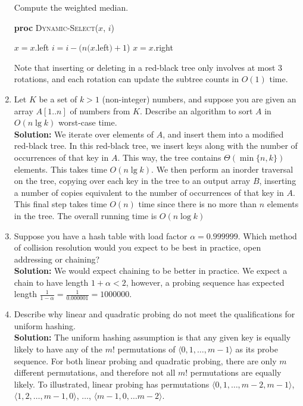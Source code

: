 \documentclass[letterpaper,11pt]{article}
\begin{document}
\begin{enumerate}
\begin{algorithm}[!htb]
\caption{Compute the weighted median.}
{\bf proc} \textsc{Dynamic-Select}($x$, $i$)
\begin{algorithmic}[1]
\State $x = x.$left
\Else{}
\State $i = i - (n(x.$left$) + 1$)
\State $x = x.$right
\EndIf
\EndWhile
\State {}
\end{algorithmic}
\label{algorithm:dynamic-select}
\end{algorithm}

Note that inserting or deleting in a red-black tree only involves at most $3$ rotations, and each rotation can update the subtree counts in $O(1)$ time. 

\item Let $K$ be a set of $k>1$ (non-integer) numbers, and suppose you are given an array $A[1..n]$ of numbers from $K$. Describe an algorithm to sort $A$ in $O(n\lg k)$ worst-case time.\\

\textbf{Solution:} We iterate over elements of $A$, and insert them into a modified red-black tree. In this red-black tree, we insert keys along with the number of occurrences of that key in $A$. This way, the tree contains $\Theta(\min\{n,k\})$ elements. This takes time $O(n\lg k)$. We then perform an inorder traversal on the tree, copying over each key in the tree to an output array $B$, inserting a number of copies equivalent to the number of occurrences of that key in $A$. This final step takes time $O(n)$ time since there is no more than $n$ elements in the tree. The overall running time is $O(n\log k)$

\item Suppose you have a hash table with load factor $\alpha = 0.999999$. Which method of collision resolution would you expect to be best in practice, open addressing or chaining?\\

\textbf{Solution:} We would expect chaining to be better in practice. We expect a chain to have length $1 + \alpha < 2$, however, a probing sequence has expected length $\frac{1}{1-\alpha} = \frac{1}{0.000001} = 1000000$.

\item Describe why linear and quadratic probing do not meet the qualifications for uniform hashing.\\

\textbf{Solution:} The uniform hashing assumption is that any given key is equally likely to have any of the $m!$ permutations
of $\langle0,1,\ldots,m-1\rangle$ as its probe sequence. For both linear probing and quadratic probing, there are only $m$ different permutations, and therefore not all $m!$ permutations are equally likely. To illustrated, linear probing has permutations $\langle 0,1,\ldots,m-2,m-1\rangle$, $\langle1,2,\ldots,m-1, 0\rangle$, $\ldots$, $\langle m-1,0,\ldots m-2\rangle$. 


\end{enumerate}
\end{document}
